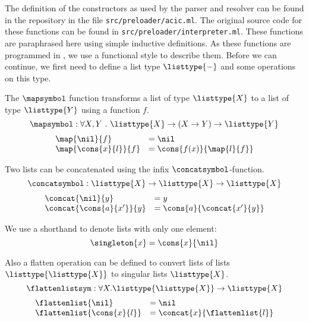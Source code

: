 The definition of the constructors as used by the parser and resolver can be found
in the \roerei repository in the file \lstinline{src/preloader/acic.ml}.
The original source code for these functions can be found in \lstinline{src/preloader/interpreter.ml}.
These functions are paraphrased here using simple inductive definitions.
As these functions are programmed in \ocaml, we use a functional style to describe them.
Before we can continue, we first need to define a list type $\listtype{-}$ and some operations on this type.

\begin{definition}[\mapsymbol]
  The $\mapsymbol$ function transforms a list of type $\listtype{X}$ to a list of type $\listtype{Y}$ using a function $f$.
  \[ \mapsymbol : \forall X, Y ~.~ \listtype{X} \rightarrow (X \rightarrow Y) \rightarrow \listtype{Y} \]
  \[ \begin{array}{ll}
      \map{\nil}{f} & = \nil \\
      \map{\cons{x}{l}}{f} & = \cons{f(x)}{\map{l}{f}} \\
    \end{array} \]
\end{definition}

\begin{definition}[\concatsymbol]
  Two lists can be concatenated using the infix $\concatsymbol$-function.
  \[ \concatsymbol : \listtype{X} \rightarrow \listtype{X} \rightarrow \listtype{X} \]
  \[ \begin{array}{ll}
      \concat{\nil}{y} & = y \\
      \concat{\cons{a}{x'}}{y} & = \cons{a}{\concat{x'}{y}} \\
    \end{array} \]
\end{definition}

\begin{definition}[\singleton{-}]
  We use a shorthand to denote lists with only one element:
  \[ \singleton{x} = \cons{x}{\nil} \]
\end{definition}

\begin{definition}[\flattenlistsym]
  Also a flatten operation can be defined to convert lists of lists $\listtype{\listtype{X}}$ to singular lists $\listtype{X}$.
  \[ \flattenlistsym : \forall X . \listtype{\listtype{X}} \rightarrow \listtype{X} \]
  \[ \begin{array}{ll}
      \flattenlist{\nil} & = \nil \\
      \flattenlist{\cons{x}{l}} & = \concat{x}{\flattenlist{l}} \\
    \end{array} \]
\end{definition}

